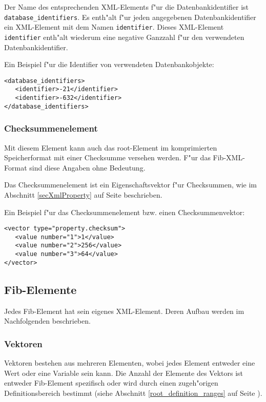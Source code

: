 Der Name des entsprechenden XML-Elements f"ur die Datenbankidentifier ist \verb|database_identifiers|. Es enth"alt f"ur jeden angegebenen Datenbankidentifier ein XML-Element mit dem Namen \verb|identifier|. Dieses XML-Element \verb|identifier| enth"alt wiederum eine negative Ganzzahl f"ur den verwendeten Datenbankidentifier.

\bigskip\noindent
Ein Beispiel f"ur die Identifier von verwendeten Datenbankobjekte:
\begin{verbatim}
<database_identifiers>
   <identifier>-21</identifier>
   <identifier>-632</identifier>
</database_identifiers>
\end{verbatim}


\subsubsection{Checksummenelement}
\label{secXmlRootChecksumm}

Mit diesem Element kann auch das root-Element im komprimierten Speicherformat mit einer Checksumme versehen werden. F"ur das Fib-XML-Format sind diese Angaben ohne Bedeutung.

Das Checksummenelement ist ein Eigenschaftsvektor f"ur Checksummen, wie im Abschnitt \ref{secXmlProperty} auf Seite \pageref{secXmlProperty} beschrieben.

\bigskip\noindent
Ein Beispiel f"ur das Checksummenelement bzw. einen Checksummenvektor:
\begin{verbatim}
<vector type="property.checksum">
   <value number="1">1</value>
   <value number="2">256</value>
   <value number="3">64</value>
</vector>
\end{verbatim}




\subsection{Fib-Elemente}
\label{secXmlFibElement}

Jedes Fib-Element hat sein eigenes XML-Element. Deren Aufbau werden im Nachfolgenden beschrieben.


\subsubsection{Vektoren}
\label{secXmlVector}

Vektoren bestehen aus mehreren Elementen, wobei jedes Element entweder eine Wert oder eine Variable sein kann. Die Anzahl der Elemente des Vektors ist entweder Fib-Element spezifisch oder wird durch einen zugeh"origen Definitionsbereich bestimmt (siehe Abschnitt \ref{root_definition_ranges} auf Seite \pageref{root_definition_ranges}).


